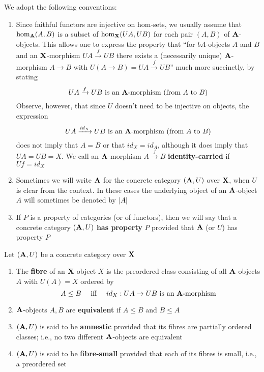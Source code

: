 \documentclass[11pt]{article}
\begin{document}
\begin{remark}
We adopt the following conventions:
\begin{enumerate}
\item Since faithful functors are injective on hom-sets, we usually assume that
\(\operatorname{hom}_{\operatorname{\textbf{A}}}(A,B)\) is a subset of \(\operatorname{hom}_{\operatorname{\textbf{X}}}(UA,UB)\) for each pair
\((A,B)\) of \(\operatorname{\textbf{A}}\)-objects. This allows one to express the property that
``for \(bA\)-objects \(A\) and \(B\) and an \(\operatorname{\textbf{X}}\)-morphism
\(UA\xrightarrow{f}UB\) there exists a (necessarily unique)
\(\operatorname{\textbf{A}}\)-morphism \(A\to B\) with \(U(A\to B)=UA\xrightarrow{f}UB\)'' much
more succinctly, by stating
\begin{equation*}
UA\xrightarrow{f}UB\text{ is an $\operatorname{\textbf{A}}$-morphism (from $A$ to $B$)}
\end{equation*}
Observe, however, that since \(U\) doesn't need to be injective on
objects, the expression
\begin{equation*}
UA\xrightarrow{id_X}UB\text{ is an $\operatorname{\textbf{A}}$-morphism (from $A$ to $B$)}
\end{equation*}
does not imply that \(A=B\) or that \(id_X=id_A\), although it does imply
that \(UA=UB=X\). We call an \(\operatorname{\textbf{A}}\)-morphism \(A\xrightarrow{f}B\)
\textbf{identity-carried} if \(Uf=id_X\)
\item Sometimes we will write \(\operatorname{\textbf{A}}\) for the concrete category \((\operatorname{\textbf{A}},U)\) over
\(\operatorname{\textbf{X}}\), when \(U\) is clear from the context. In these cases the
underlying object of an \(\operatorname{\textbf{A}}\)-object \(A\) will sometimes be denoted by \(\abs{A}\)
\item If \(P\) is a property of categories (or of functors), then we will say
that a concrete category \((\operatorname{\textbf{A}},U)\) \textbf{has property} \(P\) provided that
\(\operatorname{\textbf{A}}\) (or \(U\)) has property \(P\)
\end{enumerate}
\end{remark}

\begin{definition}[]
Let \((\operatorname{\textbf{A}},U)\) be a concrete category over \(\operatorname{\textbf{X}}\)
\begin{enumerate}
\item The \textbf{fibre} of an \(\operatorname{\textbf{X}}\)-object \(X\) is the preordered class consisting of
all \(\operatorname{\textbf{A}}\)-objects \(A\) with \(U(A)=X\) ordered by
\begin{equation*}
A\le B \quad\text{ iff }\quad
id_X:UA\to UB\text{ is an $\operatorname{\textbf{A}}$-morphism}
\end{equation*}
\item \(\operatorname{\textbf{A}}\)-objects \(A,B\) are \textbf{equivalent} if \(A\le B\) and \(B\le A\)
\item \((\operatorname{\textbf{A}},U)\) is said to be \textbf{amnestic} provided that its fibres are partially
ordered classes; i.e., no two different \(\operatorname{\textbf{A}}\)-objects are equivalent
\item \((\operatorname{\textbf{A}},U)\) is said to be \textbf{fibre-small} provided that each of its fibres is
small, i.e., a preordered set
\end{enumerate}
\end{definition}
\end{document}
